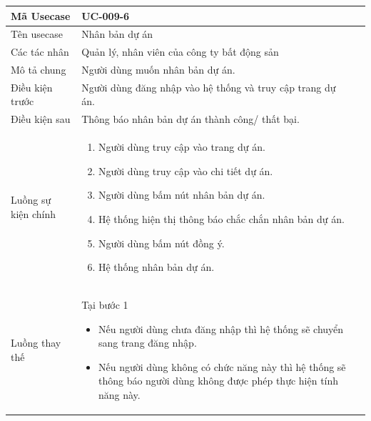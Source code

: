 \documentclass[12pt,a4paper]{article}
\begin{document}
    \begin{table}[H]
        \centering
        \begin{tabular}{|p{3.5cm}|p{11.5cm}|c|}
            \hline
            Mã Usecase      & UC-009-6                                                   \\
            \hline
            Tên usecase     & Nhân bản dự án                                             \\
            \hline
            Các tác nhân    & Quản lý, nhân viên của công ty bất động sản                \\
            \hline
            Mô tả chung     & Người dùng muốn nhân bản dự án.                            \\
            \hline

            Điều kiện trước & Người dùng đăng nhập vào hệ thống và truy cập trang dự án. \\
            \hline

            Điều kiện sau   & Thông báo nhân bản dự án thành công/ thất bại.             \\
            \hline

            Luồng sự kiện chính & \vspace{-.8cm}\begin{enumerate}
                                                    \item Người dùng truy cập vào trang dự án.
                                                    \item Người dùng truy cập vào chi tiết dự án.
                                                    \item  Người dùng bấm nút nhân bản dự án.
                                                    \item  Hệ thống hiện thị thông báo chắc chắn nhân bản dự án.
                                                    \item  Người dùng bấm nút đồng ý.
                                                    \item Hệ thống nhân bản dự án.
            \end{enumerate}
            \\
            \hline
            Luồng thay thế & Tại bước 1\newline
            \vspace{-.8cm}\begin{itemize}
                              \item Nếu người dùng chưa đăng nhập thì hệ thống sẽ chuyển sang trang đăng nhập.
                              \item Nếu người dùng không có chức năng này thì hệ thống sẽ thông báo người dùng không được phép thực hiện tính năng này.
            \end{itemize}


\end{tabular}
\end{table}
\end{document}
